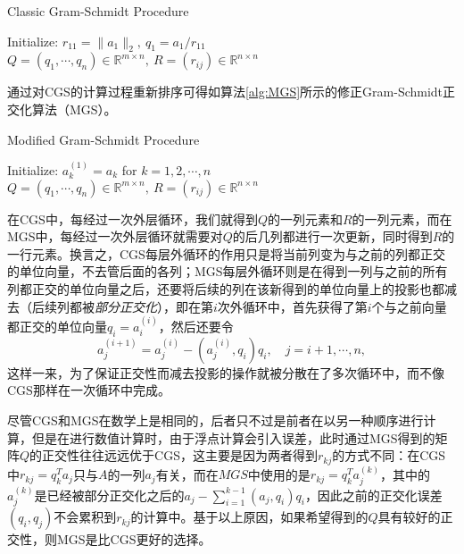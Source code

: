 \documentclass[a4paper,10pt]{ctexart}
\begin{document}
\begin{algorithm}[htbp]
    \caption{Classic Gram-Schmidt Procedure}\label{alg:CGS}
    Initialize: $ r_{11} = \| a_1 \|_2,\ q_1 = a_1 / r_{11} $\;
    \Return $ Q = (q_1,\cdots ,q_n)\in \mathbb{R}^{m\times n},\ R=(r_{ij})\in \mathbb{R}^{n\times n} $\;
\end{algorithm}
通过对CGS的计算过程重新排序可得如算法\ref{alg:MGS}所示的修正Gram-Schmidt正交化算法（MGS）。
\begin{algorithm}[htbp]
    \caption{Modified Gram-Schmidt Procedure}\label{alg:MGS}
    Initialize: $ a_k^{(1)} = a_k $ for $ k=1,2,\cdots ,n $\;
    \Return $ Q = (q_1,\cdots ,q_n)\in \mathbb{R}^{m\times n},\ R=(r_{ij})\in \mathbb{R}^{n\times n} $\;
\end{algorithm}

在CGS中，每经过一次外层循环，我们就得到$ Q $的一列元素和$ R $的一列元素，而在MGS中，每经过一次外层循环就需要对$ Q $的后几列都进行一次更新，同时得到$ R $的一行元素。换言之，CGS每层外循环的作用只是将当前列变为与之前的列都正交的单位向量，不去管后面的各列；MGS每层外循环则是在得到一列与之前的所有列都正交的单位向量之后，还要将后续的列在该新得到的单位向量上的投影也都减去（后续列都被\emph{部分正交化}），即在第$ i $次外循环中，首先获得了第$ i $个与之前向量都正交的单位向量$ q_i = a^{(i)}_i $，然后还要令
\[
    a^{(i+1)}_j = a_j^{(i)} - (a_j^{(i)}, q_i)q_i,\quad j = i+1,\cdots ,n,
\]
这样一来，为了保证正交性而减去投影的操作就被分散在了多次循环中，而不像CGS那样在一次循环中完成。

尽管CGS和MGS在数学上是相同的，后者只不过是前者在以另一种顺序进行计算，但是在进行数值计算时，由于浮点计算会引入误差，此时通过MGS得到的矩阵$ Q $的正交性往往远远优于CGS，这主要是因为两者得到$ r_{kj} $的方式不同：在CGS中$ r_{kj} = q_k^T a_j $只与$ A $的一列$ a_j $有关，而在$ MGS $中使用的是$ r_{kj} = q_k^T a_j^{(k)} $，其中的$ a_j^{(k)} $是已经被部分正交化之后的$ a_j - \sum_{i=1}^{k-1}(a_j,q_i)q_i $，因此之前的正交化误差$ (q_i,q_j) $不会累积到$ r_{kj} $的计算中。基于以上原因，如果希望得到的$ Q $具有较好的正交性，则MGS是比CGS更好的选择。
\end{document}
